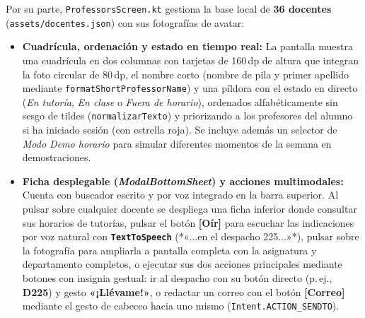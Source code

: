 \documentclass[11pt,a4paper]{article}
\begin{document}
Por su parte, \texttt{ProfessorsScreen.kt} gestiona la base local de \textbf{36 docentes} (\texttt{assets/docentes.json}) con sus fotografías de avatar:
\begin{itemize}[leftmargin=1.8em]
    \item \textbf{Cuadrícula, ordenación y estado en tiempo real:} La pantalla muestra una cuadrícula en dos columnas con tarjetas de 160\,dp de altura que integran la foto circular de 80\,dp, el nombre corto (nombre de pila y primer apellido mediante \texttt{formatShortProfessorName}) y una píldora con el estado en directo (\textit{En tutoría}, \textit{En clase} o \textit{Fuera de horario}), ordenados alfabéticamente sin sesgo de tildes (\texttt{normalizarTexto}) y priorizando a los profesores del alumno si ha iniciado sesión (con estrella roja). Se incluye además un selector de \textit{Modo Demo horario} para simular diferentes momentos de la semana en demostraciones.
    \item \textbf{Ficha desplegable (\textit{ModalBottomSheet}) y acciones multimodales:} Cuenta con buscador escrito y por voz integrado en la barra superior. Al pulsar sobre cualquier docente se despliega una ficha inferior donde consultar sus horarios de tutorías, pulsar el botón \textbf{[Oír]} para escuchar las indicaciones por voz natural con \textbf{\texttt{TextToSpeech}} (*«...en el despacho 225...»*), pulsar sobre la fotografía para ampliarla a pantalla completa con la asignatura y departamento completos, o ejecutar sus dos acciones principales mediante botones con insignia gestual: ir al despacho con su botón directo (p.\,ej., \textbf{D225}) y gesto \textbf{«¡Llévame!»}, o redactar un correo con el botón \textbf{[Correo]} mediante el gesto de cabeceo hacia uno mismo (\texttt{Intent.ACTION\_SENDTO}).
\end{itemize}

\vspace{0.35cm}
\end{document}
